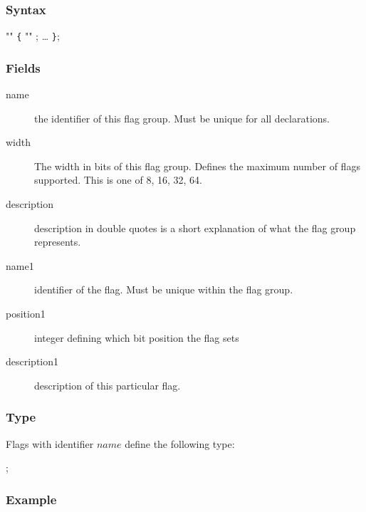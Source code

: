 \documentclass[a4paper,11pt,twoside]{report}
\begin{document}
{{\subsubsection{Syntax}

\begin{syntax}
   "" \verb+{+
      "" ;
    \ldots
\verb+}+;
\end{syntax}

\subsubsection{Fields}

\begin{description}
    \item[name] the identifier of this flag group. Must be unique for all 
                declarations.
    
    \item [width] The width in bits of this flag group. Defines the maximum 
                  number of flags supported. This is one of 8, 16, 32, 64.
    
    \item [description] description in double quotes is a short explanation of
                        what the flag group represents.
    
    \item [name1] identifier of the flag. Must be unique within the flag 
                  group. 
    
    \item [position1] integer defining which bit position the flag sets
    
    \item [description1] description of this particular flag.
\end{description}

\subsubsection{Type}
Flags with identifier $name$ define the following type:
\begin{syntax}
 ;
\end{syntax}

\subsubsection{Example}

}}
\end{document}
